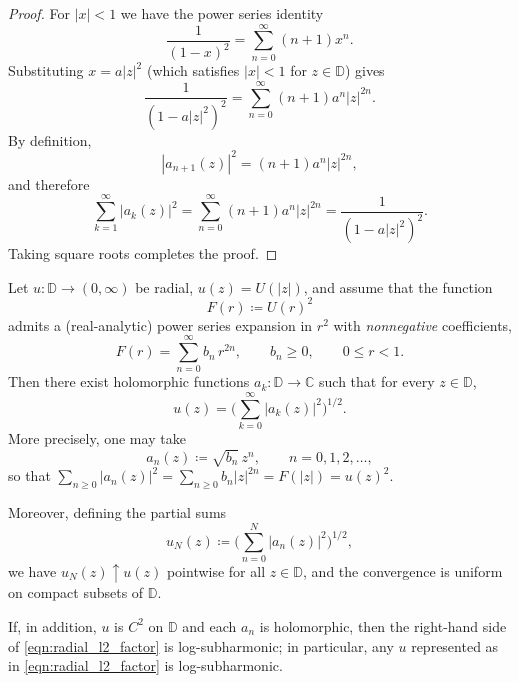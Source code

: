 \documentclass[a4paper,10pt]{amsart}
\begin{document}
\begin{proof}
For $|x|<1$ we have the power series identity
\[
\frac{1}{(1-x)^2}=\sum_{n=0}^{\infty}(n+1)x^{n}.
\]
Substituting $x=a|z|^{2}$ (which satisfies $|x|<1$ for $z\in\mathbb D$) gives
\[
\frac{1}{(1-a|z|^{2})^{2}}
=\sum_{n=0}^{\infty}(n+1)a^{n}|z|^{2n}.
\]
By definition,
\[
|a_{n+1}(z)|^{2}=(n+1)a^{n}|z|^{2n},
\]
and therefore
\[
\sum_{k=1}^{\infty}|a_k(z)|^{2}
=\sum_{n=0}^{\infty}(n+1)a^{n}|z|^{2n}
=\frac{1}{(1-a|z|^{2})^{2}}.
\]
Taking square roots completes the proof.
\end{proof}

\begin{numexamp}\label{thm:radial_hilbert_factorization}
Let $u:\mathbb D\to(0,\infty)$ be radial, $u(z)=U(|z|)$, and assume that the function
\[
F(r)\coloneqq U(r)^2
\]
admits a (real-analytic) power series expansion in $r^2$ with \emph{nonnegative} coefficients,
\begin{equation}\label{eqn:radial_nonneg_series}
F(r)=\sum_{n=0}^\infty b_n\,r^{2n},\qquad b_n\ge 0,\qquad 0\le r<1.
\end{equation}
Then there exist holomorphic functions $a_k:\mathbb D\to\mathbb C$ such that for every $z\in\mathbb D$,
\begin{equation}\label{eqn:radial_l2_factor}
u(z)=\Big(\sum_{k=0}^\infty |a_k(z)|^2\Big)^{1/2}.
\end{equation}
More precisely, one may take
\begin{equation}\label{eqn:radial_l2_factor_explicit}
a_n(z)\coloneqq \sqrt{b_n}\,z^n,\qquad n=0,1,2,\dots,
\end{equation}
so that $\sum_{n\ge 0}|a_n(z)|^2=\sum_{n\ge 0} b_n |z|^{2n}=F(|z|)=u(z)^2$.

Moreover, defining the partial sums
\[
u_N(z)\coloneqq \Big(\sum_{n=0}^N |a_n(z)|^2\Big)^{1/2},
\]
we have $u_N(z)\uparrow u(z)$ pointwise for all $z\in\mathbb D$, and the convergence is uniform on compact subsets of $\mathbb D$.

\smallskip
If, in addition, $u$ is $C^2$ on $\mathbb D$ and each $a_n$ is holomorphic, then the right-hand side of \eqref{eqn:radial_l2_factor} is log-subharmonic; in particular, any $u$ represented as in \eqref{eqn:radial_l2_factor} is log-subharmonic.
\end{numexamp}
\end{document}
